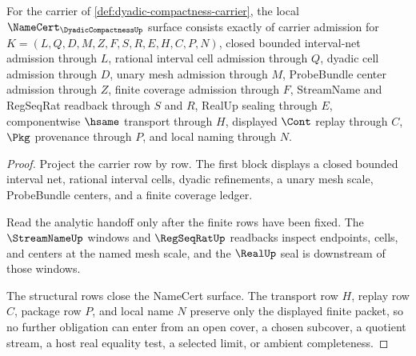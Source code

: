 \begin{theorem}
\label{thm:dyadic-compactness-namecert-obligations}
For the carrier of \autoref{def:dyadic-compactness-carrier}, the local $\NameCert_{\DyadicCompactnessUp}$ surface consists exactly of carrier admission for $K=(L,Q,D,M,Z,F,S,R,E,H,C,P,N)$, closed bounded interval-net admission through $L$, rational interval cell admission through $Q$, dyadic cell admission through $D$, unary mesh admission through $M$, ProbeBundle center admission through $Z$, finite coverage admission through $F$, StreamName and RegSeqRat readback through $S$ and $R$, RealUp sealing through $E$, componentwise $\hsame$ transport through $H$, displayed $\Cont$ replay through $C$, $\Pkg$ provenance through $P$, and local naming through $N$.
\end{theorem}
\begin{proof}
Project the carrier row by row. The first block displays a closed bounded interval net, rational interval cells, dyadic refinements, a unary mesh scale, ProbeBundle centers, and a finite coverage ledger.

Read the analytic handoff only after the finite rows have been fixed. The $\StreamNameUp$ windows and $\RegSeqRatUp$ readbacks inspect endpoints, cells, and centers at the named mesh scale, and the $\RealUp$ seal is downstream of those windows.

The structural rows close the NameCert surface. The transport row $H$, replay row $C$, package row $P$, and local name $N$ preserve only the displayed finite packet, so no further obligation can enter from an open cover, a chosen subcover, a quotient stream, a host real equality test, a selected limit, or ambient completeness.
\end{proof}

